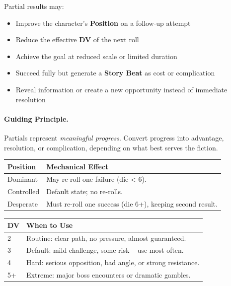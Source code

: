 Partial results may:
\begin{itemize}
  \item Improve the character's \textbf{Position} on a follow-up attempt
  \item Reduce the effective \textbf{DV} of the next roll
  \item Achieve the goal at reduced scale or limited duration
  \item Succeed fully but generate a \textbf{Story Beat} as cost or complication
  \item Reveal information or create a new opportunity instead of immediate resolution
\end{itemize}

\paragraph{Guiding Principle.}
Partials represent \emph{meaningful progress}. Convert progress into advantage, resolution, or complication, depending on what best serves the fiction.

\begin{tcolorbox}[title=Position Effects, colback=white!97!gray, colframe=black!80!gray, breakable]
\begin{tabularx}{\linewidth}{lX}
\toprule
\textbf{Position} & \textbf{Mechanical Effect} \\
\midrule
Dominant & May re-roll one failure (die < 6). \\
Controlled & Default state; no re-rolls. \\
Desperate & Must re-roll one success (die 6+), keeping second result. \\
\bottomrule
\end{tabularx}
\end{tcolorbox}

\begin{tcolorbox}[title=Difficulty Ladder -- Beginner Focus, colback=white!97!gray, colframe=black!80!gray, breakable]
\begin{tabularx}{\linewidth}{lX}
\toprule
\textbf{DV} & \textbf{When to Use} \\
\midrule
2 & Routine: clear path, no pressure, almost guaranteed. \\
3 & Default: mild challenge, some risk -- use most often. \\
4 & Hard: serious opposition, bad angle, or strong resistance. \\
5+ & Extreme: major boss encounters or dramatic gambles. \\
\bottomrule
\end{tabularx}
\end{tcolorbox}

